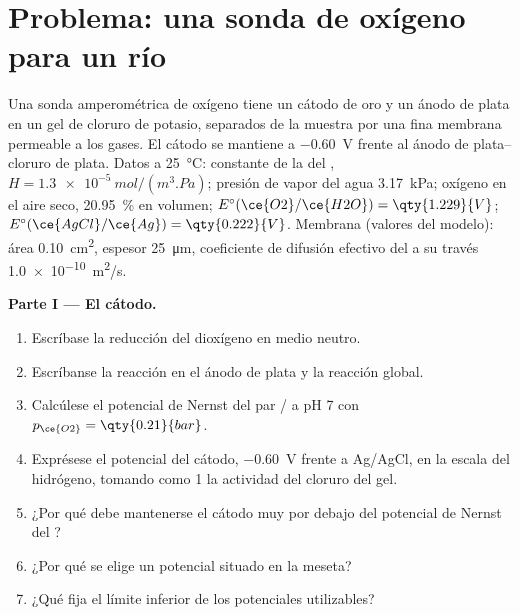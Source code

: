 \section{Problema: una sonda de oxígeno para un río}

\begin{problem}
\label{pb:b2:current-potential-curves:1}
Una sonda amperométrica de oxígeno tiene un cátodo de oro y un ánodo de plata en un
gel de cloruro de potasio, separados de la muestra por una fina membrana permeable
a los gases. El cátodo se mantiene a \qty{-0.60}{V} frente al ánodo de plata--cloruro
de plata. Datos a \qty{25}{\degreeCelsius}: constante de la  del
, $H = \qty{1.3e-5}{mol/(m^3.Pa)}$; presión de vapor del agua
\qty{3.17}{kPa}; oxígeno en el aire seco, 20.95~\% en volumen; $E^\circ(\ce{O2}/\ce{H2O}) =
\qty{1.229}{V}$; $E^\circ(\ce{AgCl}/\ce{Ag}) = \qty{0.222}{V}$. Membrana (valores del
modelo): área \qty{0.10}{cm^2}, espesor \qty{25}{\micro m}, coeficiente de difusión
efectivo del  a su través \qty{1.0e-10}{m^2/s}.

\medskip
\noindent\textbf{Parte I --- El cátodo.}
\begin{enumerate}
  \item Escríbase la reducción del dioxígeno en medio neutro.
  \item Escríbanse la reacción en el ánodo de plata y la reacción global.
  \item Calcúlese el potencial de Nernst del par / a pH 7 con
        $p_{\ce{O2}} = \qty{0.21}{bar}$.
  \item Exprésese el potencial del cátodo, \qty{-0.60}{V} frente a Ag/AgCl, en la
        escala del hidrógeno, tomando como 1 la actividad del cloruro del gel.
  \item ¿Por qué debe mantenerse el cátodo muy por debajo del potencial de Nernst del
        ?
  \item ¿Por qué se elige un potencial situado en la meseta?
  \item ¿Qué fija el límite inferior de los potenciales utilizables?
\end{enumerate}


\end{problem}
